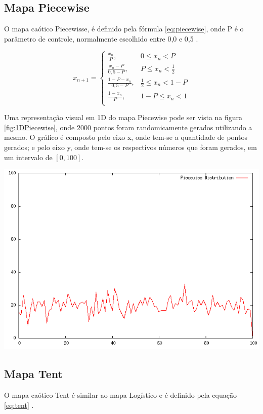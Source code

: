 \subsection{Mapa Piecewise}

O mapa caótico Piecewisse, é definido pela fórmula \ref{eq:piecewise}, onde P é o parâmetro de controle, normalmente escolhido entre 0,0 e 0,5 \cite{gandomi}.

\begin{equation}
\label{eq:piecewise}
x_{n + 1} =
\begin{cases}
    \frac{x_{n}}{P}, & \text{$0 \leq x_{n} < P$}\\
    \frac{x_{n} - P}{0,5 - P}, & \text{$P \leq x_{n} < \frac{1}{2}$}\\
    \frac{1-P-x_{n}}{0,5 - P}, & \text{$\frac{1}{2} \leq x_{n} < 1-P $}\\
    \frac{1-x_{n}}{P}, & \text{$1-P \leq x_{n} < 1$}\\
\end{cases}
\end{equation}

Uma representação visual em 1D do mapa Piecewise pode ser vista na figura \ref{fig:1DPiecewise}, onde 2000 pontos foram randomicamente gerados utilizando a mesmo. O gráfico é composto pelo eixo x, onde tem-se a quantidade de pontos gerados; e pelo eixo y, onde tem-se os respectivos números que foram gerados, em um intervalo de $[0, 100]$.

{
    \centering
    \includegraphics[width=0.55\linewidth]{figuras/DistribuicaoPiecewise.png}
    \label{fig:1DPiecewise}
}

\subsection{Mapa Tent}

O mapa caótico Tent é similar ao mapa Logístico e é definido pela equação \ref{eq:tent} \cite{gandomi}.

